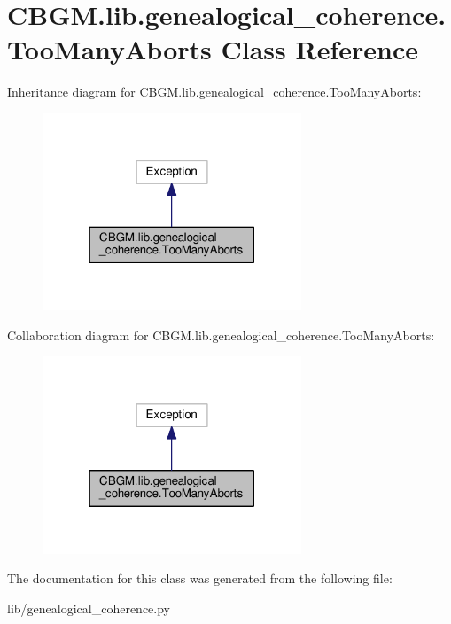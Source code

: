 \hypertarget{classCBGM_1_1lib_1_1genealogical__coherence_1_1TooManyAborts}{}\section{C\+B\+G\+M.\+lib.\+genealogical\+\_\+coherence.\+Too\+Many\+Aborts Class Reference}
\label{classCBGM_1_1lib_1_1genealogical__coherence_1_1TooManyAborts}


Inheritance diagram for C\+B\+G\+M.\+lib.\+genealogical\+\_\+coherence.\+Too\+Many\+Aborts\+:\nopagebreak
\begin{figure}[H]
\begin{center}
\leavevmode
\includegraphics[width=219pt]{classCBGM_1_1lib_1_1genealogical__coherence_1_1TooManyAborts__inherit__graph}
\end{center}
\end{figure}


Collaboration diagram for C\+B\+G\+M.\+lib.\+genealogical\+\_\+coherence.\+Too\+Many\+Aborts\+:\nopagebreak
\begin{figure}[H]
\begin{center}
\leavevmode
\includegraphics[width=219pt]{classCBGM_1_1lib_1_1genealogical__coherence_1_1TooManyAborts__coll__graph}
\end{center}
\end{figure}


The documentation for this class was generated from the following file\+:\begin{DoxyCompactItemize}
\item 
lib/genealogical\+\_\+coherence.\+py\end{DoxyCompactItemize}
